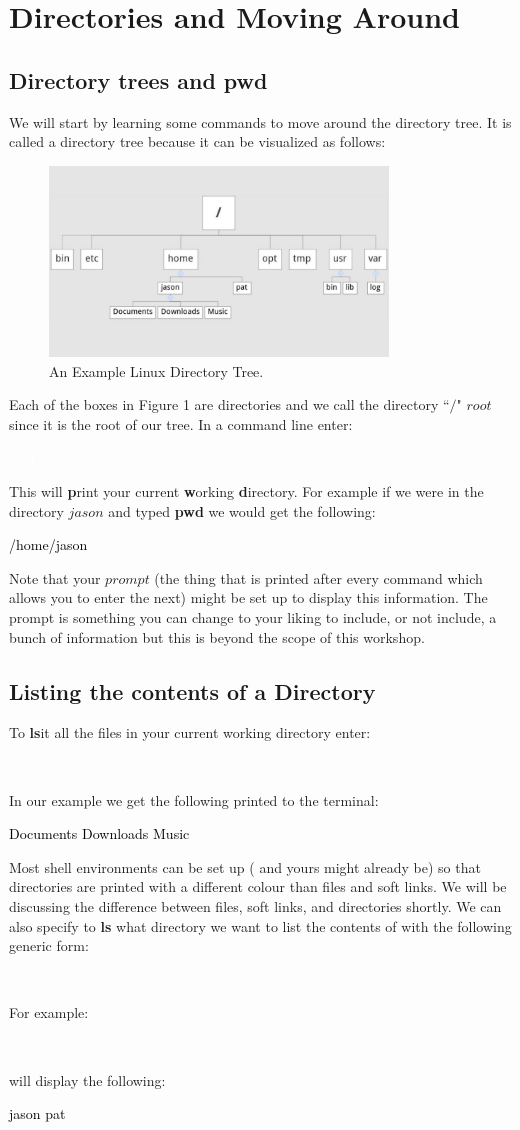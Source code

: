 \documentclass{book}
\newcommand{\commandline}[1]{\begin{center} \colorbox{Dark}{\textcolor{white}{#1}} \end{center}}
\newcommand{\exampleout}[1]{\begin{center} \colorbox{Light}{\textcolor{black}{#1}} \end{center}}
\begin{document}
\section{Directories and Moving Around}

\subsection{Directory trees and pwd}
We will start by learning some commands to move around the directory tree. It is called a directory tree because it can be visualized as follows:
\begin{figure}[ht!]
	\centering
	\includegraphics[width=90mm]{linux-directory-tree.jpg}
	\caption{An Example Linux Directory Tree.} 
\end{figure}

Each of the boxes in Figure 1 are directories and we call the directory ``$/$" $root$ since it is the root of our tree. In a command line enter:
	\commandline{pwd}
  This will \textbf{p}rint your current \textbf{w}orking \textbf{d}irectory. For example if we were in the directory $jason$ and typed \textbf{pwd} we would get the following:
	\exampleout {/home/jason}
  Note that your $prompt$ (the thing that is printed after every command which allows you to enter the next) might be set up to display this information. The prompt is something you can change to your liking to include, or not include, a bunch of information but this is beyond the scope of this workshop. \\

\subsection{Listing the contents of a Directory}
To \textbf{ls}it all the files in your current working directory enter:
	\commandline{ls}
In our example we get the following printed to the terminal:
	\exampleout {Documents Downloads Music}
	Most shell environments can be set up ( and yours might already be) so that directories are printed with a different colour than files and soft links. We will be discussing the difference between files, soft links, and directories shortly. We can also specify to \textbf{ls} what directory we want to list the contents of with the following generic form:
  	\commandline{ls dirname}
For example:
	\commandline{ls /home}
will display the following:
	\exampleout{jason pat}
\end{document}
